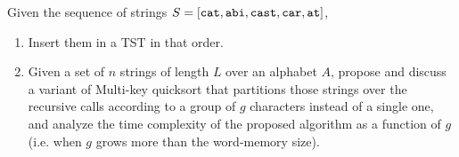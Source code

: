 \exercise

Given the sequence of strings $S = [ \text{\tt cat}, \text{\tt abi}, \text{\tt
cast}, \text{\tt car}, \text{\tt at} ]$,
%
\begin{enumerate}
  \item Insert them in a TST in that order.

  \item Given a set of $n$ strings of length $L$ over an alphabet $A$, propose and
  discuss a variant of Multi-key quicksort that partitions those strings over
  the recursive calls according to a group of $g$ characters instead of a single
  one, and analyze the time complexity of the proposed algorithm as a function
  of $g$ (i.e. when $g$ grows more than the word-memory size).

\end{enumerate}

\solution

